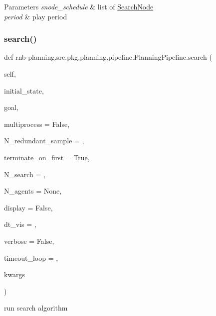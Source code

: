\begin{DoxyParams}{Parameters}
{\em snode\+\_\+schedule} & list of \hyperlink{classrnb-planning_1_1src_1_1pkg_1_1planning_1_1pipeline_1_1_search_node}{Search\+Node} \\
\hline
{\em period} & play period \\
\hline
\end{DoxyParams}
\mbox{\label{classrnb-planning_1_1src_1_1pkg_1_1planning_1_1pipeline_1_1_planning_pipeline_ad767704963c5571db51a67f0c25a566f}} 
\subsubsection{\texorpdfstring{search()}{search()}}
{\footnotesize\ttfamily def rnb-\/planning.\+src.\+pkg.\+planning.\+pipeline.\+Planning\+Pipeline.\+search (\begin{DoxyParamCaption}\item[{}]{self,  }\item[{}]{initial\+\_\+state,  }\item[{}]{goal,  }\item[{}]{multiprocess = {\ttfamily False},  }\item[{}]{N\+\_\+redundant\+\_\+sample = {},  }\item[{}]{terminate\+\_\+on\+\_\+first = {\ttfamily True},  }\item[{}]{N\+\_\+search = {},  }\item[{}]{N\+\_\+agents = {\ttfamily None},  }\item[{}]{display = {\ttfamily False},  }\item[{}]{dt\+\_\+vis = {},  }\item[{}]{verbose = {\ttfamily False},  }\item[{}]{timeout\+\_\+loop = {},  }\item[{}]{kwargs }\end{DoxyParamCaption})}



run search algorithm 


